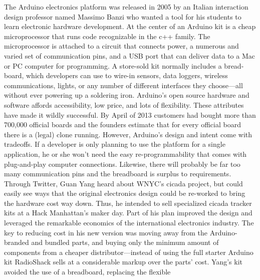The Arduino electronics platform was released in 2005 by an Italian interaction
design professor named Massimo Banzi who wanted a tool for his
students to learn electronic hardware development. At the center of an
Arduino kit is a cheap microprocessor that runs code recognizable in the
c++ family. The microprocessor is attached to a circuit that connects power,
a numerous and varied set of communication pins, and a USB port that
can deliver data to a Mac or PC computer for programming. A store-sold
kit normally includes a bread-board, which developers can use to wire-in
sensors, data loggers, wireless communications, lights, or any number of
different interfaces they choose—all without ever powering up a soldering
iron. Arduino's open source hardware and software affords accessibility,
low price, and lots of flexibility. These attributes have made it wildly successful.
By April of 2013 customers had bought more than 700,000 official
boards and the founders estimate that for every official board there is a
(legal) clone running.
However, Arduino's design and intent come with tradeoffs. If a developer is
only planning to use the platform for a single application, he or she won't
need the easy re-programmability that comes with plug-and-play computer
connections. Likewise, there will probably be far too many communication
pins and the breadboard is surplus to requirements.
Through Twitter, Guan Yang heard about WNYC's cicada project, but could
easily see ways that the original electronics design could be re-worked
to bring the hardware cost way down. Thus, he intended to sell specialized
cicada tracker kits at a Hack Manhattan's maker day. Part of his plan
improved the design and leveraged the remarkable economics of the international
electronics industry.
The key to reducing cost in his new version was moving away from the
Arduino-branded and bundled parts, and buying only the minimum
amount of components from a cheaper distributor—instead of using the
full starter Arduino kit RadioShack sells at a considerable markup over the
parts' cost. Yang's kit avoided the use of a breadboard, replacing the flexible

